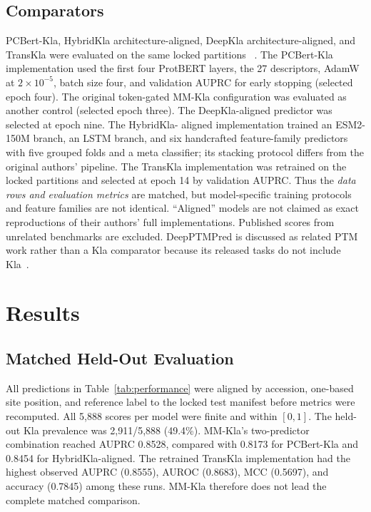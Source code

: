 \documentclass[twocolumn]{article}
\begin{document}
\subsection{Comparators}
PCBert-Kla, HybridKla architecture-aligned, DeepKla architecture-aligned,
and TransKla were evaluated on the same locked partitions
~\cite{zhang2025pcbert,hybridkla2025,lv2022deepkla,transkla2026}.
The PCBert-Kla implementation used the first four ProtBERT layers, the 27
descriptors, AdamW at $2\times10^{-5}$, batch size four, and validation AUPRC
for early stopping (selected epoch four). The original token-gated MM-Kla
configuration was evaluated as another control (selected epoch three).
The DeepKla-aligned predictor was selected at epoch nine. The HybridKla-
aligned implementation trained an ESM2-150M branch, an LSTM branch, and six
handcrafted feature-family predictors with five grouped folds and a meta
classifier; its stacking protocol differs from the original authors'
pipeline. The TransKla implementation was retrained on the locked
partitions and selected at epoch 14 by validation AUPRC. Thus the
\emph{data rows and evaluation metrics} are matched, but model-specific
training protocols and feature families are not identical. ``Aligned''
models are not claimed as exact reproductions of their authors' full
implementations. Published scores from unrelated benchmarks are excluded.
DeepPTMPred is discussed as related PTM work rather than a Kla comparator
because its released tasks do not include Kla~\cite{wang2026deepptmpred}.

\section{Results}
\subsection{Matched Held-Out Evaluation}
All predictions in Table~\ref{tab:performance} were aligned by accession,
one-based site position, and reference label to the locked test manifest
before metrics were recomputed. All 5,888 scores per model were finite and
within $[0,1]$. The held-out Kla prevalence was 2,911/5,888 (49.4\%).
MM-Kla's two-predictor combination reached AUPRC 0.8528, compared with
0.8173 for PCBert-Kla and 0.8454 for HybridKla-aligned. The retrained
TransKla implementation had the highest observed AUPRC (0.8555), AUROC
(0.8683), MCC (0.5697), and accuracy (0.7845) among these runs. MM-Kla
therefore does not lead the complete matched comparison.
\begin{table}[t]
\centering
\caption{Matched CLEAR-Lactyl internal held-out performance on the same
5,888 sites (seed 42). AUPRC denotes average precision. Threshold-dependent
metrics use 0.5. ``Aligned'' denotes an implementation adapted to this
benchmark rather than exact reproduction of the original pipeline.}
\label{tab:performance}
\small

\end{table}
\end{document}
